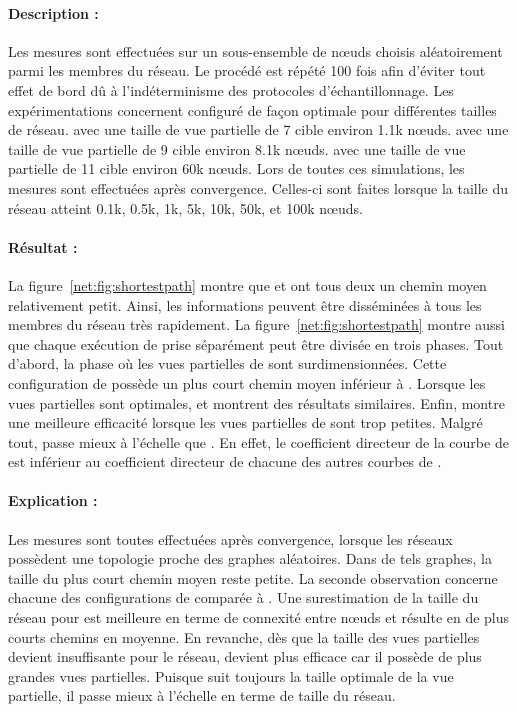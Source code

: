 \paragraph{Description :} Les mesures sont effectuées sur un sous-ensemble de
nœuds choisis aléatoirement parmi les membres du réseau. Le procédé est répété
100 fois afin d'éviter tout effet de bord dû à l'indéterminisme des protocoles
d'échantillonnage. Les expérimentations concernent \CYCLON configuré de façon
optimale pour différentes tailles de réseau. \CYCLON avec une taille de vue
partielle de 7 cible environ 1.1k nœuds.  \CYCLON avec une taille de vue
partielle de 9 cible environ 8.1k nœuds.  \CYCLON avec une taille de vue
partielle de 11 cible environ 60k nœuds. Lors de toutes ces simulations, les
mesures sont effectuées après convergence. Celles-ci sont faites lorsque la
taille du réseau atteint 0.1k, 0.5k, 1k, 5k, 10k, 50k, et 100k nœuds.

\paragraph{Résultat :} La figure~\ref{net:fig:shortestpath} montre que \CYCLON
et \SPRAY ont tous deux un chemin moyen relativement petit. Ainsi, les
informations peuvent être disséminées à tous les membres du réseau très
rapidement. La figure~\ref{net:fig:shortestpath} montre aussi que chaque
exécution de \CYCLON prise séparément peut être divisée en trois phases.  Tout
d'abord, la phase où les vues partielles de \CYCLON sont surdimensionnées. Cette
configuration de \CYCLON possède un plus court chemin moyen inférieur à
\SPRAY. Lorsque les vues partielles sont optimales, \CYCLON et \SPRAY montrent
des résultats similaires. Enfin, \SPRAY montre une meilleure efficacité lorsque
les vues partielles de \CYCLON sont trop petites. Malgré tout, \SPRAY passe
mieux à l'échelle que \CYCLON. En effet, le coefficient directeur de la courbe
de \SPRAY est inférieur au coefficient directeur de chacune des autres courbes
de \CYCLON.

\paragraph{Explication :} Les mesures sont toutes effectuées après convergence,
lorsque les réseaux possèdent une topologie proche des graphes aléatoires.  Dans
de tels graphes, la taille du plus court chemin moyen reste petite.  La seconde
observation concerne chacune des configurations de \CYCLON comparée à
\SPRAY. Une surestimation de la taille du réseau pour \CYCLON est meilleure en
terme de connexité entre nœuds et résulte en de plus courts chemins en
moyenne. En revanche, dès que la taille des vues partielles devient insuffisante
pour le réseau, \SPRAY devient plus efficace car il possède de plus grandes vues
partielles. Puisque \SPRAY suit toujours la taille optimale de la vue partielle,
il passe mieux à l'échelle en terme de taille du réseau.

